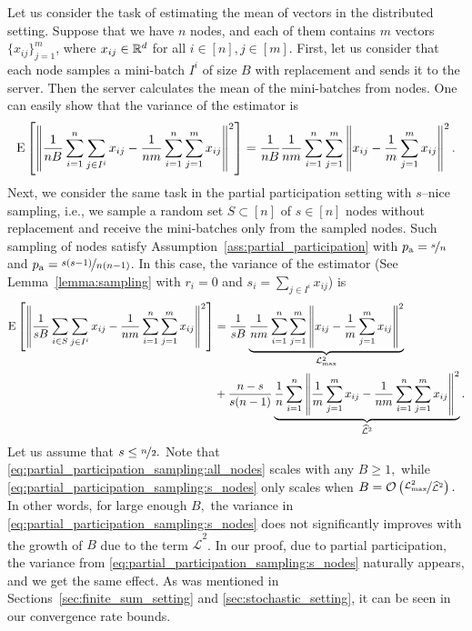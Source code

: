 \documentclass{article}
\newcommand*{\probavailable}{\ensuremath{p_{\textnormal{a}}}}
\begin{document}
Let us consider the task of estimating the mean of vectors in the distributed setting. Suppose that we have $n$ nodes, and each of them contains $m$ vectors $\{x_{ij}\}_{j=1}^m$, where $x_{ij} \in \mathbb{R}^d$ for all $i \in [n], j \in [m].$ First, let us consider that each node samples a mini-batch $I^i$ of size $B$ with replacement and sends it to the server. Then the server calculates the mean of the mini-batches from nodes. One can easily show that the variance of the estimator is
\begin{align}
  \label{eq:partial_participation_sampling:all_nodes}
  {\rm E}\left[\left\| \frac{1}{n B}\sum_{i=1}^n \sum_{j \in I^i} x_{ij} - \frac{1}{n m}\sum_{i=1}^n \sum_{j=1}^m x_{ij} \right\|^2\right] = \frac{1}{n B} \frac{1}{n m} \sum_{i=1}^n \sum_{j=1}^m \left\| x_{ij} - \frac{1}{m}\sum_{j=1}^m x_{ij} \right\|^2.
\end{align}
Next, we consider the same task in the partial participation setting with $s$--nice sampling, i.e., we sample a random set $S \subset [n]$ of $s \in [n]$ nodes without replacement and receive the mini-batches only from the sampled nodes. Such sampling of nodes satisfy Assumption~\ref{ass:partial_participation} with $\probavailable = \nicefrac{s}{n}$ and $\probavailable = \nicefrac{s (s-1)}{n (n-1)}$. In this case, the variance of the estimator (See Lemma~\ref{lemma:sampling} with $r_i = 0$ and $s_i = \sum_{j \in I^i} x_{ij}$) is
\begin{align}
  {\rm E}\left[\left\| \frac{1}{s B}\sum_{i \in S} \sum_{j \in I^i} x_{ij} - \frac{1}{n m}\sum_{i=1}^n \sum_{j=1}^m x_{ij} \right\|^2\right] &= \frac{1}{s B}\underbrace{\frac{1}{n m} \sum_{i=1}^n \sum_{j=1}^m \left\| x_{ij} - \frac{1}{m}\sum_{j=1}^m x_{ij} \right\|^2}_{\mathcal{L}_{\max}^2} \label{eq:partial_participation_sampling:s_nodes}\\
  &+\frac{n - s}{s (n - 1)} \underbrace{\frac{1}{n} \sum_{i=1}^n \left\| \frac{1}{m}\sum_{j=1}^m x_{ij} - \frac{1}{n m}\sum_{i=1}^n \sum_{j=1}^m x_{ij} \right\|^2}_{\widehat{\mathcal{L}}^2} \nonumber.
\end{align}
Let us assume that $s \leq \nicefrac{n}{2}.$ Note that \eqref{eq:partial_participation_sampling:all_nodes} scales with any $B \geq 1,$ while \eqref{eq:partial_participation_sampling:s_nodes} only scales when $B = \mathcal{O}\left(\nicefrac{\mathcal{L}_{\max}^2}{\widehat{\mathcal{L}}^2}\right).$ In other words, for large enough $B,$ the variance in \eqref{eq:partial_participation_sampling:s_nodes} does not significantly improves with the growth of $B$ due to the term $\widehat{\mathcal{L}}^2$. In our proof, due to partial participation, the variance from \eqref{eq:partial_participation_sampling:s_nodes} naturally appears, and we get the same effect. As was mentioned in Sections~\ref{sec:finite_sum_setting} and \ref{sec:stochastic_setting}, it can be seen in our convergence rate bounds.
\end{document}
